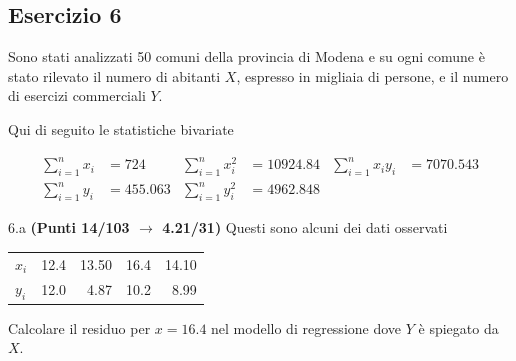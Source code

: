 \documentclass[
  11pt,
]{book}
\theoremstyle{mytheoremstyle}
\theoremstyle{mydefstyle}
\begin{document}
\subsection{Esercizio 6}\label{esercizio-6-13}

Sono stati analizzati 50 comuni della provincia di Modena e su ogni comune è stato rilevato
il numero di abitanti \(X\), espresso in migliaia di persone, e il numero di esercizi commerciali \(Y\).

Qui di seguito le statistiche bivariate

\begin{align*}
  \sum_{i=1}^n x_i &= 724 &\sum_{i=1}^n x_i^2 &= 10924.84 &\sum_{i=1}^n x_i y_i &= 7070.543\\
  \sum_{i=1}^n y_i &= 455.063 & \sum_{i=1}^n y_i^2 &= 4962.848 &
\end{align*}

6.a \textbf{(Punti 14/103 \(\rightarrow\) 4.21/31)} Questi sono alcuni dei dati osservati

\begin{table}[H]
\centering
\begin{tabular}{lrrrr}
\toprule
  &  &  &  & \\
\midrule
$x_i$ & 12.4 & 13.50 & 16.4 & 14.10\\
$y_i$ & 12.0 & 4.87 & 10.2 & 8.99\\
\bottomrule
\end{tabular}
\end{table}

Calcolare il residuo per \(x=16.4\) nel modello di regressione dove \(Y\) è spiegato da \(X\).
\end{document}
